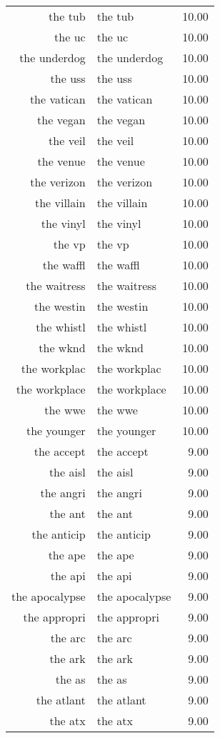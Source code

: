 \begin{table}[ht]
\begin{tabular}{rlr}
  the tub & the tub & 10.00 \\ 
  the uc & the uc & 10.00 \\ 
  the underdog & the underdog & 10.00 \\ 
  the uss & the uss & 10.00 \\ 
  the vatican & the vatican & 10.00 \\ 
  the vegan & the vegan & 10.00 \\ 
  the veil & the veil & 10.00 \\ 
  the venue & the venue & 10.00 \\ 
  the verizon & the verizon & 10.00 \\ 
  the villain & the villain & 10.00 \\ 
  the vinyl & the vinyl & 10.00 \\ 
  the vp & the vp & 10.00 \\ 
  the waffl & the waffl & 10.00 \\ 
  the waitress & the waitress & 10.00 \\ 
  the westin & the westin & 10.00 \\ 
  the whistl & the whistl & 10.00 \\ 
  the wknd & the wknd & 10.00 \\ 
  the workplac & the workplac & 10.00 \\ 
  the workplace & the workplace & 10.00 \\ 
  the wwe & the wwe & 10.00 \\ 
  the younger & the younger & 10.00 \\ 
  the accept & the accept & 9.00 \\ 
  the aisl & the aisl & 9.00 \\ 
  the angri & the angri & 9.00 \\ 
  the ant & the ant & 9.00 \\ 
  the anticip & the anticip & 9.00 \\ 
  the ape & the ape & 9.00 \\ 
  the api & the api & 9.00 \\ 
  the apocalypse & the apocalypse & 9.00 \\ 
  the appropri & the appropri & 9.00 \\ 
  the arc & the arc & 9.00 \\ 
  the ark & the ark & 9.00 \\ 
  the as & the as & 9.00 \\ 
  the atlant & the atlant & 9.00 \\ 
  the atx & the atx & 9.00 \\ 

\end{tabular}
\end{table}

